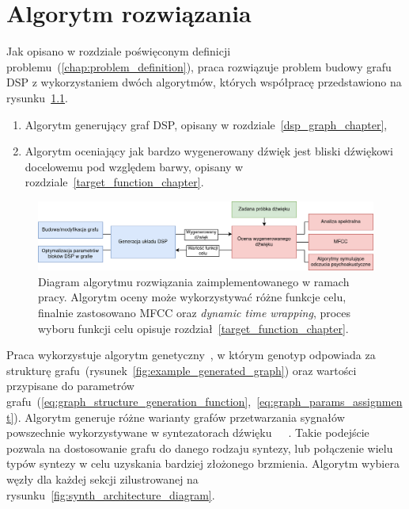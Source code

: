 \chapter{Algorytm rozwiązania}\label{chap:solution_algorithm}

Jak opisano w rozdziale poświęconym definicji problemu~(\ref{chap:problem_definition}), praca
rozwiązuje problem budowy grafu DSP z wykorzystaniem dwóch algorytmów, których współpracę przedstawiono na
rysunku~\ref{fig:solution_algorithm_diagram}.

\begin{enumerate}
  \item Algorytm generujący graf DSP, opisany w rozdziale~\ref{dsp_graph_chapter},
  \item Algorytm oceniający jak bardzo wygenerowany dźwięk jest bliski dźwiękowi docelowemu pod względem barwy,
    opisany w rozdziale~\ref{target_function_chapter}.
\end{enumerate}

\begin{figure}[H]    
    \centering
    \includegraphics[width=1.0\linewidth]{rys04/solution_algorithm_diagram.png}
    \caption{
      Diagram algorytmu rozwiązania zaimplementowanego w ramach pracy.
      Algorytm oceny może wykorzystywać różne funkcje celu, finalnie zastosowano
      MFCC oraz \textit{dynamic time wrapping},
      proces wyboru funkcji celu opisuje rozdział~\ref{target_function_chapter}.
    }\label{fig:solution_algorithm_diagram}
\end{figure}

Praca wykorzystuje algorytm genetyczny~\cite{2020SciPy-NMeth}, w którym genotyp odpowiada za
strukturę grafu~(rysunek~\ref{fig:example_generated_graph}) oraz wartości
przypisane do parametrów
grafu~(\ref{eq:graph_structure_generation_function},~\ref{eq:graph_params_assignment}).
Algorytm generuje różne warianty grafów przetwarzania sygnałów powszechnie
wykorzystywane w syntezatorach dźwięku~\cite{minilogue_diagram}~\cite{digitone_manual}~\cite{yamaha_dx7_manual}.
Takie podejście pozwala na dostosowanie grafu do danego rodzaju syntezy,
lub połączenie wielu typów syntezy w celu uzyskania bardziej złożonego brzmienia.
Algorytm wybiera węzły dla każdej sekcji
zilustrowanej na rysunku~\ref{fig:synth_architecture_diagram}.

